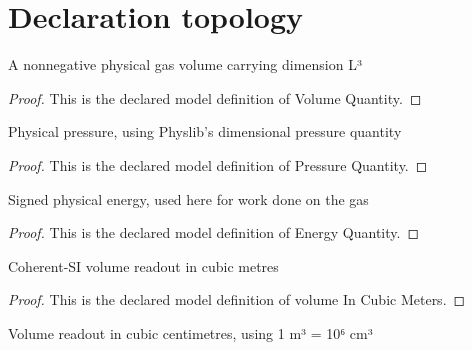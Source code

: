 \section{Declaration topology}
\begin{definition}
  \label{def:physics:phyx-mini-0404:phyxminiproblems-problemphyxmini0404-volumequantity}
  A nonnegative physical gas volume carrying dimension L³
\end{definition}
\begin{proof}
  This is the declared model definition of Volume Quantity.
\end{proof}
\begin{definition}
  \label{def:physics:phyx-mini-0404:phyxminiproblems-problemphyxmini0404-pressurequantity}
  Physical pressure, using Physlib's dimensional pressure quantity
\end{definition}
\begin{proof}
  This is the declared model definition of Pressure Quantity.
\end{proof}
\begin{definition}
  \label{def:physics:phyx-mini-0404:phyxminiproblems-problemphyxmini0404-energyquantity}
  Signed physical energy, used here for work done on the gas
\end{definition}
\begin{proof}
  This is the declared model definition of Energy Quantity.
\end{proof}
\begin{definition}
  \label{def:physics:phyx-mini-0404:phyxminiproblems-problemphyxmini0404-volumeincubicmeters}
  Coherent-SI volume readout in cubic metres
\end{definition}
\begin{proof}
  This is the declared model definition of volume In Cubic Meters.
\end{proof}
\begin{definition}
  \label{def:physics:phyx-mini-0404:phyxminiproblems-problemphyxmini0404-volumeincubiccentimeters}
  Volume readout in cubic centimetres, using 1 m³ = 10⁶ cm³
\end{definition}
